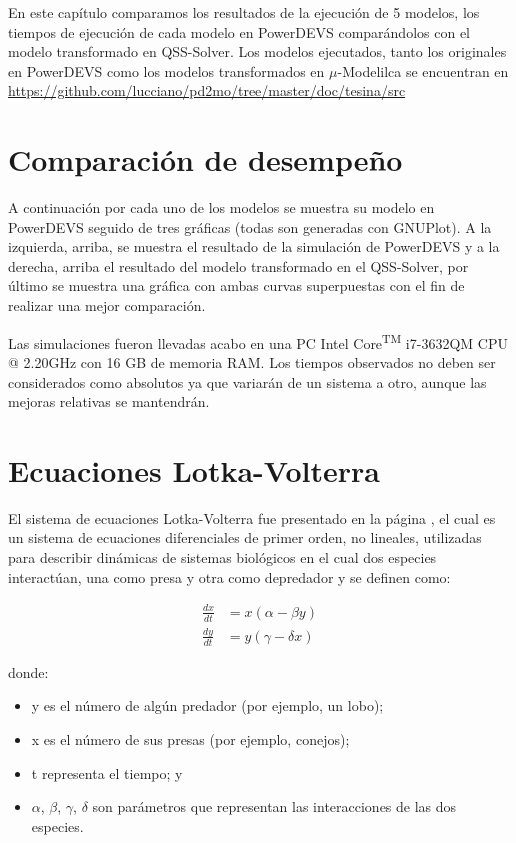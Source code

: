 	En este capítulo comparamos los resultados de la ejecución de 5 modelos, los tiempos de ejecución de cada modelo en PowerDEVS comparándolos con 
	el modelo transformado en QSS-Solver. 
	Los modelos ejecutados, tanto los originales en PowerDEVS como los modelos transformados en $\mu$-Modelilca se encuentran en 
	\url{https://github.com/lucciano/pd2mo/tree/master/doc/tesina/src}

\section{Comparación de desempeño}
	A continuación por cada uno de los modelos se muestra su modelo en PowerDEVS seguido de tres gráficas (todas son generadas con GNUPlot). 
	A la izquierda, arriba, se muestra el resultado de la simulación de PowerDEVS y a la derecha, arriba el resultado del modelo transformado en el QSS-Solver, 
	por último se muestra una gráfica con ambas curvas superpuestas con el fin de realizar una mejor comparación.

	Las simulaciones fueron llevadas acabo en una PC Intel\textsuperscript{\textregistered} Core\textsuperscript{TM} i7-3632QM CPU @ 2.20GHz con 16 GB de memoria RAM. Los tiempos observados no deben ser considerados como absolutos ya que variarán de un sistema a otro, aunque las mejoras relativas se mantendrán.


\section{Ecuaciones Lotka-Volterra}

	El sistema de ecuaciones Lotka-Volterra fue presentado en la página \pageref{lotka_volterra_ref}, el cual es un sistema de ecuaciones diferenciales de primer orden, no lineales, utilizadas para describir dinámicas de sistemas biológicos en el cual dos especies interactúan, una como presa y otra como depredador y se definen como:

\begin{align*}
\frac{dx}{dt} & = x(\alpha - \beta y)\\
\frac{dy}{dt} & =y(\gamma - \delta  x)
\end{align*}

donde:
\begin{itemize}
	\item y es el número de algún predador (por ejemplo, un lobo);
    \item x es el número de sus presas (por ejemplo, conejos);
    \item t representa el tiempo; y
    \item $\alpha$, $\beta$, $\gamma$, $\delta$ son parámetros que representan las interacciones de las dos especies.
\end{itemize}

